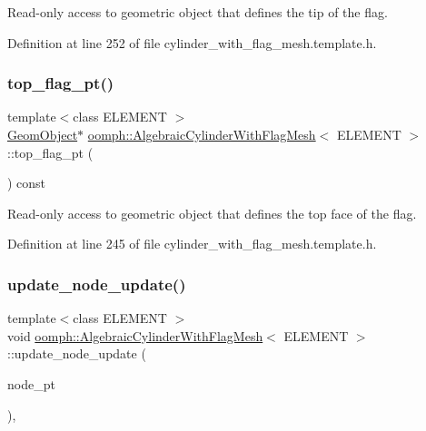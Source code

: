 Read-\/only access to geometric object that defines the tip of the flag. 



Definition at line 252 of file cylinder\+\_\+with\+\_\+flag\+\_\+mesh.\+template.\+h.

\mbox{\label{classoomph_1_1AlgebraicCylinderWithFlagMesh_a06bc13adad4aaa037d989bba9e3bf79d}} 
\subsubsection{\texorpdfstring{top\+\_\+flag\+\_\+pt()}{top\_flag\_pt()}}
{\footnotesize\ttfamily template$<$class E\+L\+E\+M\+E\+NT $>$ \\
\hyperlink{classoomph_1_1GeomObject}{Geom\+Object}$\ast$ \hyperlink{classoomph_1_1AlgebraicCylinderWithFlagMesh}{oomph\+::\+Algebraic\+Cylinder\+With\+Flag\+Mesh}$<$ E\+L\+E\+M\+E\+NT $>$\+::top\+\_\+flag\+\_\+pt (\begin{DoxyParamCaption}{ }\end{DoxyParamCaption}) const\hspace{0.3cm}{\ttfamily [inline]}}



Read-\/only access to geometric object that defines the top face of the flag. 



Definition at line 245 of file cylinder\+\_\+with\+\_\+flag\+\_\+mesh.\+template.\+h.

\mbox{\label{classoomph_1_1AlgebraicCylinderWithFlagMesh_a9d909de1db84a3b7e42494535b152d92}} 
\subsubsection{\texorpdfstring{update\+\_\+node\+\_\+update()}{update\_node\_update()}}
{\footnotesize\ttfamily template$<$class E\+L\+E\+M\+E\+NT $>$ \\
void \hyperlink{classoomph_1_1AlgebraicCylinderWithFlagMesh}{oomph\+::\+Algebraic\+Cylinder\+With\+Flag\+Mesh}$<$ E\+L\+E\+M\+E\+NT $>$\+::update\+\_\+node\+\_\+update (\begin{DoxyParamCaption}\item[{\hyperlink{classoomph_1_1AlgebraicNode}{Algebraic\+Node} $\ast$\&}]{node\+\_\+pt }\end{DoxyParamCaption})\hspace{0.3cm}{\ttfamily [inline]}, {\ttfamily [virtual]}}



